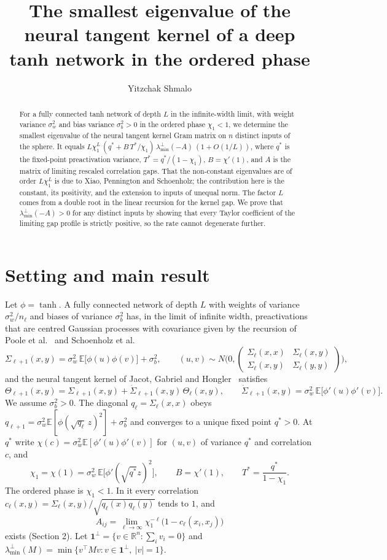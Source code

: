 \documentclass[11pt]{amsart}
\title[The smallest NTK eigenvalue in the ordered phase]{The smallest eigenvalue of the neural tangent kernel of a deep tanh network in the ordered phase}
\author{Yitzchak Shmalo}
\theoremstyle{remark}\newtheorem{remark}[theorem]{Remark}
\newcommand{\E}{\mathbb{E}}
\begin{document}
\begin{abstract}
For a fully connected tanh network of depth $L$ in the infinite-width limit, with weight variance $\sigma_w^2$ and bias
variance $\sigma_b^2>0$ in the ordered phase $\chi_1<1$, we determine the smallest eigenvalue of the neural tangent kernel
Gram matrix on $n$ distinct inputs of the sphere. It equals
$L\chi_1^L\,(q^*+B\,T^*/\chi_1)\,\lambda_{\min}^{\perp}(-A)\,(1+O(1/L))$, where $q^*$ is the fixed-point preactivation
variance, $T^*=q^*/(1-\chi_1)$, $B=\chi'(1)$, and $A$ is the matrix of limiting rescaled correlation gaps. That the
non-constant eigenvalues are of order $L\chi_1^L$ is due to Xiao, Pennington and Schoenholz; the contribution here is the
constant, its positivity, and the extension to inputs of unequal norm. The factor $L$ comes from a double root in the
linear recursion for the kernel gap. We prove that $\lambda_{\min}^{\perp}(-A)>0$ for any
distinct inputs by showing that every Taylor coefficient of the limiting gap profile is strictly positive, so the
rate cannot degenerate further.
\end{abstract}
\maketitle

\section{Setting and main result}
Let $\phi=\tanh$. A fully connected network of depth $L$ with weights of variance $\sigma_w^2/n_{\ell}$ and biases of
variance $\sigma_b^2$ has, in the limit of infinite width, preactivations that are centred Gaussian processes with
covariance given by the recursion of Poole et al.~\cite{poole} and Schoenholz et al.~\cite{sgg}
\[
\Sigma_{\ell+1}(x,y)=\sigma_w^2\,\E\big[\phi(u)\phi(v)\big]+\sigma_b^2,\qquad
(u,v)\sim N\!\Big(0,\begin{pmatrix}\Sigma_\ell(x,x)&\Sigma_\ell(x,y)\\ \Sigma_\ell(x,y)&\Sigma_\ell(y,y)\end{pmatrix}\Big),
\]
and the neural tangent kernel of Jacot, Gabriel and Hongler~\cite{jgh} satisfies
\[
\Theta_{\ell+1}(x,y)=\Sigma_{\ell+1}(x,y)+\dot\Sigma_{\ell+1}(x,y)\,\Theta_\ell(x,y),\qquad
\dot\Sigma_{\ell+1}(x,y)=\sigma_w^2\,\E\big[\phi'(u)\phi'(v)\big].
\]
We assume $\sigma_b^2>0$. The diagonal $q_\ell=\Sigma_\ell(x,x)$ obeys $q_{\ell+1}=\sigma_w^2\E[\phi(\sqrt{q_\ell}\,z)^2]+\sigma_b^2$
and converges to a unique fixed point $q^*>0$. At $q^*$ write $\chi(c)=\sigma_w^2\E[\phi'(u)\phi'(v)]$ for $(u,v)$ of
variance $q^*$ and correlation $c$, and
\[
\chi_1=\chi(1)=\sigma_w^2\,\E\big[\phi'(\sqrt{q^*}z)^2\big],\qquad B=\chi'(1),\qquad T^*=\frac{q^*}{1-\chi_1}.
\]
The ordered phase is $\chi_1<1$. In it every correlation $c_\ell(x,y)=\Sigma_\ell(x,y)/\sqrt{q_\ell(x)q_\ell(y)}$ tends
to $1$, and
\[
A_{ij}=\lim_{\ell\to\infty}\chi_1^{-\ell}\big(1-c_\ell(x_i,x_j)\big)
\]
exists (Section 2). Let $\mathbf 1^\perp=\{v\in\mathbb R^n:\sum_i v_i=0\}$ and
$\lambda_{\min}^\perp(M)=\min\{v^\top Mv: v\in\mathbf 1^\perp,\ |v|=1\}$.
\end{document}
